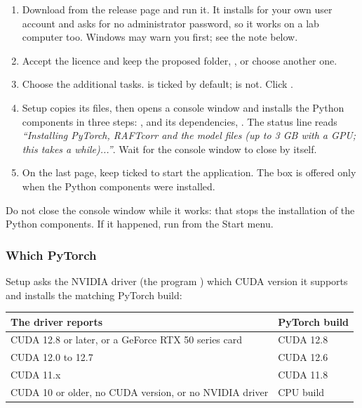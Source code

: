 \begin{enumerate}
  \item Download  from the release page and run it. It installs
    for your own user account and asks for no administrator password, so it works on a lab
    computer too. Windows may warn you first; see the note below.
  \item Accept the licence and keep the proposed folder,
    , or choose another one.
  \item Choose the additional tasks.  is
    ticked by default;  is not. Click .
  \item Setup copies its files, then opens a console window and installs the Python components in
    three steps: ,  and its dependencies,
    . The status line reads \emph{``Installing PyTorch, RAFTcorr and the
    model files (up to 3 GB with a GPU; this takes a while)...''}. Wait for the console window to
    close by itself.
  \item On the last page, keep  ticked to start the application. The box is
    offered only when the Python components were installed.
\end{enumerate}

\begin{warnbox}
Do not close the console window while it works: that stops the installation of the Python
components. If it happened, run  from the Start menu.
\end{warnbox}

\subsubsection*{Which PyTorch}
Setup asks the NVIDIA driver (the program ) which CUDA version it supports and
installs the matching PyTorch build:

\begin{center}
\begin{tabular}{ll}
  \toprule
  The driver reports & PyTorch build \\
  \midrule
  CUDA 12.8 or later, or a GeForce RTX 50 series card & CUDA 12.8 \\
  CUDA 12.0 to 12.7 & CUDA 12.6 \\
  CUDA 11.x & CUDA 11.8 \\
  CUDA 10 or older, no CUDA version, or no NVIDIA driver & CPU build \\
  \bottomrule
\end{tabular}
\end{center}

